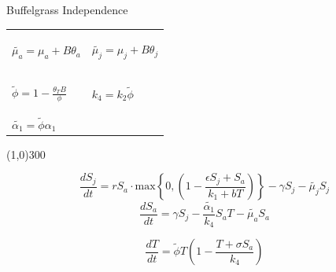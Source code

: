 \documentclass{beamer}
\begin{document}
\begin{frame}{Buffelgrass Independence}


\begin{center}

\footnotesize{\begin{tabular}{ m{4cm} | m{4cm} }
$\tilde{\mu_a} = \mu_a + B\theta_a$& \begin{flushright} $\tilde{\mu_j} = \mu_j + B\theta_j$\end{flushright} \\
$\tilde{\phi} = 1 - \displaystyle\frac{\theta_T B}{\phi}$& \begin{flushright}$k_4 = k_2 \tilde{\phi}$\end{flushright}\\
$\tilde{\alpha_1} = \tilde{\phi}\alpha_1$ & 
\end{tabular}}
\end{center}

\begin{center}
\line(1,0){300}
\end{center}

\begin{equation}
\displaystyle\frac{dS_j}{dt}= rS_a\cdot \text{max}\left \{0,\left(1-\displaystyle\frac{\epsilon S_j + S_a}{k_1+b T}\right)\right \} - \gamma S_j - \tilde{\mu_{j}} S_j
\end{equation}
\begin{equation}
\displaystyle\frac{dS_a}{dt} = \gamma S_j -\displaystyle\frac{\tilde{\alpha_1}}{k_4}S_a T - \tilde{\mu_a} S_a
\end{equation}

\begin{equation}
\displaystyle\frac{dT}{dt} = \tilde{\phi}T\left(1 - \displaystyle\frac{T + \sigma S_a}{k_4}\right) 
\end{equation}


\end{frame}
\end{document}
